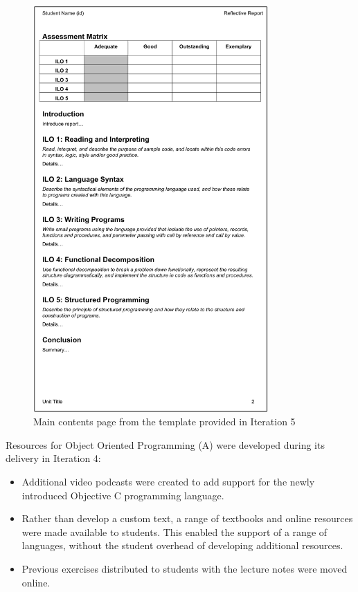 \begin{figure}[p]
  \centering
  \includegraphics[width=0.8\textwidth]{I5Template}
  \caption{Main contents page from the template provided in Iteration 5}
  \label{fig:i5_template}
\end{figure}


Resources for Object Oriented Programming (A) were developed during its delivery in Iteration 4:
\begin{itemize}[noitemsep,nolistsep]
	\item Additional video podcasts were created to add support for the newly introduced Objective C programming language.
	\item Rather than develop a custom text, a range of textbooks and online resources were made available to students. This enabled the support of a range of languages, without the student overhead of developing additional resources.
	\item Previous exercises distributed to students with the lecture notes were moved online.
\end{itemize}

